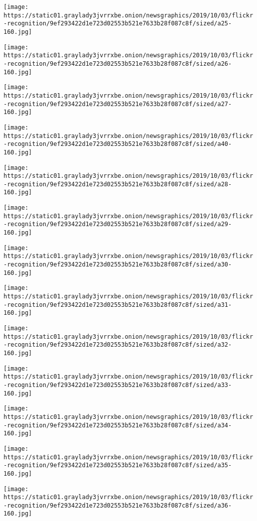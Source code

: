 \texttt{[image: https://static01.graylady3jvrrxbe.onion/newsgraphics/2019/10/03/flickr-recognition/9ef293422d1e723d02553b521e7633b28f087c8f/sized/a25-160.jpg]}

\texttt{[image: https://static01.graylady3jvrrxbe.onion/newsgraphics/2019/10/03/flickr-recognition/9ef293422d1e723d02553b521e7633b28f087c8f/sized/a26-160.jpg]}

\texttt{[image: https://static01.graylady3jvrrxbe.onion/newsgraphics/2019/10/03/flickr-recognition/9ef293422d1e723d02553b521e7633b28f087c8f/sized/a27-160.jpg]}

\texttt{[image: https://static01.graylady3jvrrxbe.onion/newsgraphics/2019/10/03/flickr-recognition/9ef293422d1e723d02553b521e7633b28f087c8f/sized/a40-160.jpg]}

\texttt{[image: https://static01.graylady3jvrrxbe.onion/newsgraphics/2019/10/03/flickr-recognition/9ef293422d1e723d02553b521e7633b28f087c8f/sized/a28-160.jpg]}

\texttt{[image: https://static01.graylady3jvrrxbe.onion/newsgraphics/2019/10/03/flickr-recognition/9ef293422d1e723d02553b521e7633b28f087c8f/sized/a29-160.jpg]}

\texttt{[image: https://static01.graylady3jvrrxbe.onion/newsgraphics/2019/10/03/flickr-recognition/9ef293422d1e723d02553b521e7633b28f087c8f/sized/a30-160.jpg]}

\texttt{[image: https://static01.graylady3jvrrxbe.onion/newsgraphics/2019/10/03/flickr-recognition/9ef293422d1e723d02553b521e7633b28f087c8f/sized/a31-160.jpg]}

\texttt{[image: https://static01.graylady3jvrrxbe.onion/newsgraphics/2019/10/03/flickr-recognition/9ef293422d1e723d02553b521e7633b28f087c8f/sized/a32-160.jpg]}

\texttt{[image: https://static01.graylady3jvrrxbe.onion/newsgraphics/2019/10/03/flickr-recognition/9ef293422d1e723d02553b521e7633b28f087c8f/sized/a33-160.jpg]}

\texttt{[image: https://static01.graylady3jvrrxbe.onion/newsgraphics/2019/10/03/flickr-recognition/9ef293422d1e723d02553b521e7633b28f087c8f/sized/a34-160.jpg]}

\texttt{[image: https://static01.graylady3jvrrxbe.onion/newsgraphics/2019/10/03/flickr-recognition/9ef293422d1e723d02553b521e7633b28f087c8f/sized/a35-160.jpg]}

\texttt{[image: https://static01.graylady3jvrrxbe.onion/newsgraphics/2019/10/03/flickr-recognition/9ef293422d1e723d02553b521e7633b28f087c8f/sized/a36-160.jpg]}

